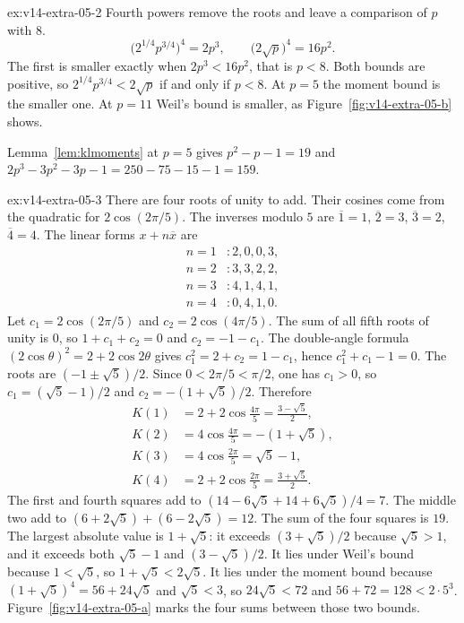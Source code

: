 \begin{solution}{ex:v14-extra-05-2}
\idea Fourth powers remove the roots and leave a comparison of $p$ with $8$.
\writeup 
\[
\bigl(2^{1/4}p^{3/4}\bigr)^4=2p^3,\qquad\bigl(2\sqrt p\bigr)^4=16p^2.
\]
The first is smaller exactly when $2p^3<16p^2$, that is $p<8$. Both bounds are positive, so $2^{1/4}p^{3/4}<2\sqrt p$ if and only if $p<8$. At $p=5$ the moment bound is the smaller one. At $p=11$ Weil's bound is smaller, as Figure~\ref{fig:v14-extra-05-b} shows.

Lemma~\ref{lem:klmoments} at $p=5$ gives $p^2-p-1=19$ and $2p^3-3p^2-3p-1=250-75-15-1=159$.
\end{solution}

\begin{solution}{ex:v14-extra-05-3}
\idea There are four roots of unity to add. Their cosines come from the quadratic for $2\cos(2\pi/5)$.
\writeup The inverses modulo $5$ are $\overline1=1$, $\overline2=3$, $\overline3=2$, $\overline4=4$. The linear forms $x+n\overline x$ are
\[
\begin{aligned}
n=1&: 2,0,0,3,\\
n=2&: 3,3,2,2,\\
n=3&: 4,1,4,1,\\
n=4&: 0,4,1,0.
\end{aligned}
\]
Let $c_1=2\cos(2\pi/5)$ and $c_2=2\cos(4\pi/5)$. The sum of all fifth roots of unity is $0$, so $1+c_1+c_2=0$ and $c_2=-1-c_1$. The double-angle formula $(2\cos\theta)^2=2+2\cos2\theta$ gives $c_1^2=2+c_2=1-c_1$, hence $c_1^2+c_1-1=0$. The roots are $(-1\pm\sqrt5)/2$. Since $0<2\pi/5<\pi/2$, one has $c_1>0$, so $c_1=(\sqrt5-1)/2$ and $c_2=-(1+\sqrt5)/2$. Therefore
\[
\begin{aligned}
K(1)&=2+2\cos\frac{4\pi}5=\frac{3-\sqrt5}2,\\
K(2)&=4\cos\frac{4\pi}5=-(1+\sqrt5),\\
K(3)&=4\cos\frac{2\pi}5=\sqrt5-1,\\
K(4)&=2+2\cos\frac{2\pi}5=\frac{3+\sqrt5}2.
\end{aligned}
\]
The first and fourth squares add to $(14-6\sqrt5+14+6\sqrt5)/4=7$. The middle two add to $(6+2\sqrt5)+(6-2\sqrt5)=12$. The sum of the four squares is $19$.
The largest absolute value is $1+\sqrt5$: it exceeds $(3+\sqrt5)/2$ because $\sqrt5>1$, and it exceeds both $\sqrt5-1$ and $(3-\sqrt5)/2$. It lies under Weil's bound because $1<\sqrt5$, so $1+\sqrt5<2\sqrt5$. It lies under the moment bound because $(1+\sqrt5)^4=56+24\sqrt5$ and $\sqrt5<3$, so $24\sqrt5<72$ and $56+72=128<2\cdot5^3$. Figure~\ref{fig:v14-extra-05-a} marks the four sums between those two bounds.
\end{solution}

